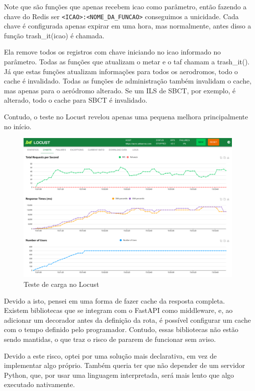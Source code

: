 Note que são funções que apenas recebem icao como parâmetro, então fazendo a chave
do Redis ser \verb|<ICAO>:<NOME_DA_FUNCAO>| conseguimos a unicidade. Cada chave é 
configurada apenas expirar em uma hora, mas normalmente, antes disso a função
trash\_it(icao) é chamada.

Ela remove todos os registros com chave iniciando no
icao informado no parâmetro. Todas as funções que atualizam o metar e o taf chamam
a trash\_it(). Já que estas funções atualizam informações para todos os aerodromos,
todo o cache é invalidado. Todas as funções de administração também invalidam o cache,
mas apenas para 
o aeródromo alterado. Se um ILS de SBCT, por exemplo, é alterado, todo o cache
para SBCT é invalidado.

Contudo, o teste no Locust revelou apenas uma pequena melhora principalmente no
início.

\begin{figure}[ht]
    \begin{center}
    \includegraphics[width=400pt]{img/locust-cache-redis.png}
    \caption{Teste de carga no Locust}
    \label{fig:locust-no-cache}
    \end{center}
\end{figure}

Devido a isto, 
pensei em uma forma de fazer cache da resposta completa. Existem bibliotecas que 
se integram com o FastAPI como middleware, e, ao adicionar um decorador antes da
definição da rota, é possível configurar um cache com o tempo definido pelo 
programador. Contudo, essas bibliotecas não estão sendo mantidas, o que traz o 
risco de pararem de funcionar sem aviso.

Devido a este risco, optei por uma solução mais declarativa, em vez de implementar
algo próprio. Também queria ter que não depender de um servidor Python, que, por
usar uma linguagem interpretada, será mais lento que algo executado nativamente.

